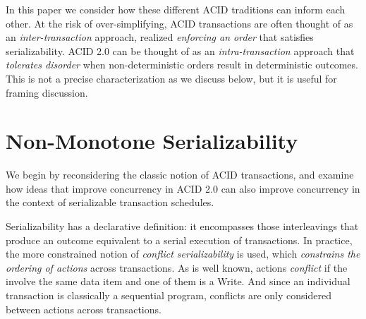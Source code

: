 \documentclass{sig-alternate}
\begin{document}
In this paper we consider how these different ACID traditions can inform each other.  At the risk of over-simplifying, ACID transactions are often thought of as an \emph{inter-transaction} approach, realized \emph{enforcing an order} that satisfies serializability.  ACID 2.0 can be thought of as an \emph{intra-transaction} approach that \emph{tolerates disorder} when non-deterministic orders result in deterministic outcomes.  This is not a precise characterization as we discuss below, but it is useful for framing discussion.

\section{Non-Monotone Serializability}
We begin by reconsidering the classic notion of ACID transactions, and examine how ideas that improve concurrency in ACID 2.0 can also improve concurrency in the context of serializable transaction schedules.

Serializability has a declarative definition: it encompasses those interleavings that produce an outcome equivalent to a serial execution of transactions.  In practice, the more constrained notion of \emph{conflict serializability} is used, which \emph{constrains the ordering of actions} across transactions.  As is well known, actions \emph{conflict} if the involve the same data item and one of them is a Write.  And since an individual transaction is classically a sequential program, conflicts are only considered between actions across transactions.
\end{document}
